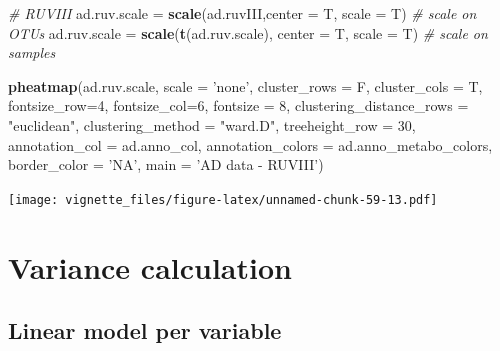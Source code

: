 \documentclass[]{book}
\newenvironment{Shaded}{\begin{snugshade}}{\end{snugshade}}
\newcommand{\KeywordTok}[1]{\textcolor[rgb]{0.13,0.29,0.53}{\textbf{#1}}}
\newcommand{\DataTypeTok}[1]{\textcolor[rgb]{0.13,0.29,0.53}{#1}}
\newcommand{\DecValTok}[1]{\textcolor[rgb]{0.00,0.00,0.81}{#1}}
\newcommand{\StringTok}[1]{\textcolor[rgb]{0.31,0.60,0.02}{#1}}
\newcommand{\CommentTok}[1]{\textcolor[rgb]{0.56,0.35,0.01}{\textit{#1}}}
\newcommand{\NormalTok}[1]{#1}
\begin{document}
\begin{Shaded}
\begin{Highlighting}[]
\CommentTok{# RUVIII}
\NormalTok{ad.ruv.scale =}\StringTok{ }\KeywordTok{scale}\NormalTok{(ad.ruvIII,}\DataTypeTok{center =}\NormalTok{ T, }\DataTypeTok{scale =}\NormalTok{ T) }\CommentTok{# scale on OTUs}
\NormalTok{ad.ruv.scale =}\StringTok{ }\KeywordTok{scale}\NormalTok{(}\KeywordTok{t}\NormalTok{(ad.ruv.scale), }\DataTypeTok{center =}\NormalTok{ T, }\DataTypeTok{scale =}\NormalTok{ T) }\CommentTok{# scale on samples}

\KeywordTok{pheatmap}\NormalTok{(ad.ruv.scale, }
         \DataTypeTok{scale =} \StringTok{'none'}\NormalTok{, }
         \DataTypeTok{cluster_rows =}\NormalTok{ F, }
         \DataTypeTok{cluster_cols =}\NormalTok{ T, }
         \DataTypeTok{fontsize_row=}\DecValTok{4}\NormalTok{, }\DataTypeTok{fontsize_col=}\DecValTok{6}\NormalTok{,}
         \DataTypeTok{fontsize =} \DecValTok{8}\NormalTok{,}
         \DataTypeTok{clustering_distance_rows =} \StringTok{"euclidean"}\NormalTok{,}
         \DataTypeTok{clustering_method =} \StringTok{"ward.D"}\NormalTok{,}
         \DataTypeTok{treeheight_row =} \DecValTok{30}\NormalTok{,}
         \DataTypeTok{annotation_col =}\NormalTok{ ad.anno_col,}
         \DataTypeTok{annotation_colors =}\NormalTok{ ad.anno_metabo_colors,}
         \DataTypeTok{border_color =} \StringTok{'NA'}\NormalTok{,}
         \DataTypeTok{main =} \StringTok{'AD data - RUVIII'}\NormalTok{)}
\end{Highlighting}
\end{Shaded}

\texttt{[image: vignette\_files/figure-latex/unnamed-chunk-59-13.pdf]}

\section{Variance calculation}\label{variance-calculation}

\subsection{Linear model per variable}\label{linear-model-per-variable}
\end{document}

